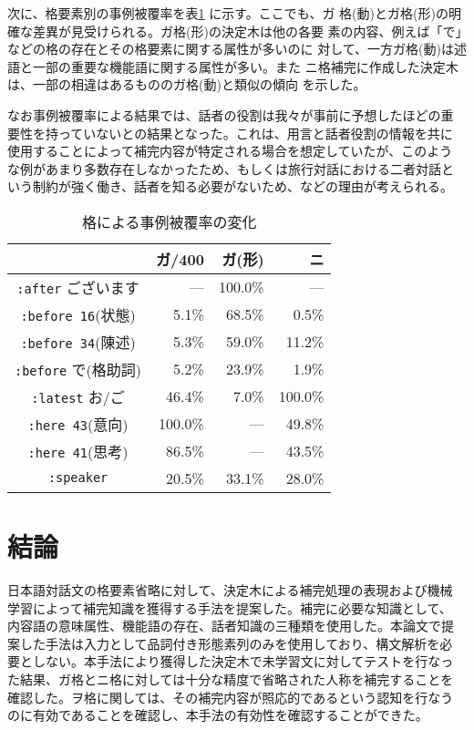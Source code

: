 次に、格要素別の事例被覆率を表\ref{事例被覆率/格} に示す。ここでも、ガ
格(動)とガ格(形)の明確な差異が見受けられる。ガ格(形)の決定木は他の各要
素の内容、例えば「で」などの格の存在とその格要素に関する属性が多いのに
対して、一方ガ格(動)は述語と一部の重要な機能語に関する属性が多い。また
ニ格補完に作成した決定木は、一部の相違はあるもののガ格(動)と類似の傾向
を示した。

なお事例被覆率による結果では、話者の役割は我々が事前に予想したほどの重
要性を持っていないとの結果となった。これは、用言と話者役割の情報を共に
使用することによって補完内容が特定される場合を想定していたが、このよう
な例があまり多数存在しなかったため、もしくは旅行対話における二者対話と
いう制約が強く働き、話者を知る必要がないため、などの理由が考えられる。


\begin{table}
\begin{center}
\caption{格による事例被覆率の変化}
\label{事例被覆率/格}
\begin{tabular}{c|*{3}{r}}
\hline\hline
                   & ガ/400 & ガ(形) & ニ \hfill \\
\hline
\verb+:after+ ございます&  --- &100.0\% &  --- \\
\verb+:before 16+(状態)  &  5.1\% & 68.5\% &  0.5\% \\
\verb+:before 34+(陳述)  &  5.3\% & 59.0\% & 11.2\% \\
\verb+:before+ で(格助詞)        &  5.2\% & 23.9\% &  1.9\% \\
\hline
\verb+:latest+ お/ご & 46.4\% &  7.0\% &100.0\% \\
\verb+:here 43+(意向)  &100.0\% &  --- & 49.8\% \\
\verb+:here 41+(思考)  & 86.5\% &  --- & 43.5\% \\
\hline
\verb+:speaker+   & 20.5\% & 33.1\% & 28.0\% \\
\hline
\end{tabular}
\end{center}
\end{table}



\section{結論}
\label{節:結論}

日本語対話文の格要素省略に対して、決定木による補完処理の表現および機械
学習によって補完知識を獲得する手法を提案した。補完に必要な知識として、
内容語の意味属性、機能語の存在、話者知識の三種類を使用した。本論文で提
案した手法は入力として品詞付き形態素列のみを使用しており、構文解析を必
要としない。本手法により獲得した決定木で未学習文に対してテストを行なっ
た結果、ガ格とニ格に対しては十分な精度で省略された人称を補完することを
確認した。ヲ格に関しては、その補完内容が照応的であるという認知を行なう
のに有効であることを確認し、本手法の有効性を確認することができた。

